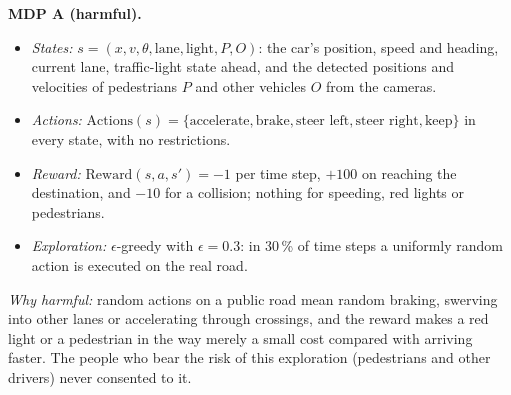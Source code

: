 \begin{solution}
\textbf{MDP A (harmful).}
\begin{itemize}[nosep]
  \item \emph{States:} $s=(x, v, \theta, \text{lane}, \text{light}, P, O)$: the car's position, speed and heading, current
        lane, traffic-light state ahead, and the detected positions and velocities of pedestrians $P$ and other
        vehicles $O$ from the cameras.
  \item \emph{Actions:} $\text{Actions}(s)=\{\text{accelerate}, \text{brake}, \text{steer left}, \text{steer right},
        \text{keep}\}$ in every state, with no restrictions.
  \item \emph{Reward:} $\text{Reward}(s,a,s')=-1$ per time step, $+100$ on reaching the destination, and $-10$ for a
        collision; nothing for speeding, red lights or pedestrians.
  \item \emph{Exploration:} $\epsilon$-greedy with $\epsilon=0.3$: in 30\,\% of time steps a uniformly random action
        is executed on the real road.
\end{itemize}
\emph{Why harmful:} random actions on a public road mean random braking, swerving into other lanes or accelerating
through crossings, and the reward makes a red light or a pedestrian in the way merely a small cost compared with
arriving faster. The people who bear the risk of this exploration (pedestrians and other drivers) never consented to
it.


\end{solution}
